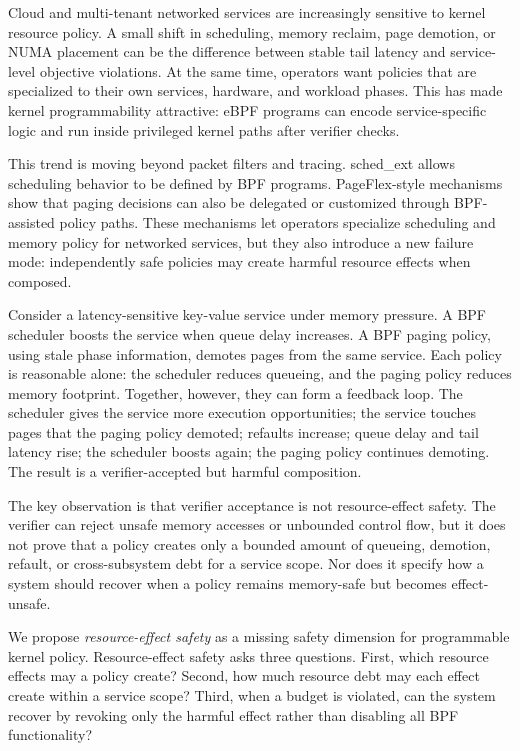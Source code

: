 \documentclass[letterpaper,twocolumn,10pt]{article}
\begin{document}
Cloud and multi-tenant networked services are increasingly sensitive to kernel resource policy. A small shift in scheduling, memory reclaim, page demotion, or NUMA placement can be the difference between stable tail latency and service-level objective violations. At the same time, operators want policies that are specialized to their own services, hardware, and workload phases. This has made kernel programmability attractive: eBPF programs can encode service-specific logic and run inside privileged kernel paths after verifier checks.

This trend is moving beyond packet filters and tracing. sched\_ext allows scheduling behavior to be defined by BPF programs. PageFlex-style mechanisms show that paging decisions can also be delegated or customized through BPF-assisted policy paths. These mechanisms let operators specialize scheduling and memory policy for networked services, but they also introduce a new failure mode: independently safe policies may create harmful resource effects when composed.

Consider a latency-sensitive key-value service under memory pressure. A BPF scheduler boosts the service when queue delay increases. A BPF paging policy, using stale phase information, demotes pages from the same service. Each policy is reasonable alone: the scheduler reduces queueing, and the paging policy reduces memory footprint. Together, however, they can form a feedback loop. The scheduler gives the service more execution opportunities; the service touches pages that the paging policy demoted; refaults increase; queue delay and tail latency rise; the scheduler boosts again; the paging policy continues demoting. The result is a verifier-accepted but harmful composition.

The key observation is that verifier acceptance is not resource-effect safety. The verifier can reject unsafe memory accesses or unbounded control flow, but it does not prove that a policy creates only a bounded amount of queueing, demotion, refault, or cross-subsystem debt for a service scope. Nor does it specify how a system should recover when a policy remains memory-safe but becomes effect-unsafe.

We propose \emph{resource-effect safety} as a missing safety dimension for programmable kernel policy. Resource-effect safety asks three questions. First, which resource effects may a policy create? Second, how much resource debt may each effect create within a service scope? Third, when a budget is violated, can the system recover by revoking only the harmful effect rather than disabling all BPF functionality?
\end{document}
